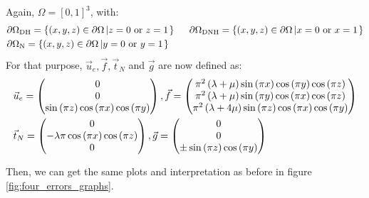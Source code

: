 \documentclass[a4paper,12pt,twoside]{report}
\begin{document}
Again, $\Omega = [0,1]^3$, with: 
\begin{equation*}
	\begin{aligned}
		& \partial \Omega_{\text{DH}} = \left\{  (x,y,z) \in \partial\Omega \left| z = 0 \text{ or } z = 1 \right.  \right\} \hspace{0.5cm} 
		\partial \Omega_{\text{DNH}} = \left\{  (x,y,z) \in \partial\Omega \left| x = 0 \text{ or } x = 1 \right.  \right\} \\
		& \partial \Omega_{\text{N}} = \left\{  (x,y,z) \in \partial\Omega \left| y = 0 \text{ or } y = 1 \right.  \right\}
	\end{aligned}
\end{equation*}
For that purpose, $\vec u_e, \vec f, \vec t_N$ and $\vec g$ are now defined as: 
\begin{equation*}
\begin{aligned}
	& \vec u_e =
	\begin{pmatrix}
		0 \\
		0 \\
		\sin{\left(\pi z \right)} \cos{\left(\pi x \right)} \cos{\left(\pi y \right)}
	\end{pmatrix}, \hfill \vec f =  \begin{pmatrix}
	\pi^{2} \left(\lambda + \mu\right) \sin{\left(\pi x \right)} \cos{\left(\pi y \right)} \cos{\left(\pi z \right)} \\
	\pi^{2} \left(\lambda + \mu\right) \sin{\left(\pi y \right)} \cos{\left(\pi x \right)} \cos{\left(\pi z \right)} \\
	\pi^{2} \left(\lambda + 4 \mu\right) \sin{\left(\pi z \right)} \cos{\left(\pi x \right)} \cos{\left(\pi y \right)}
	\end{pmatrix} \\
	& \vec t_N = \begin{pmatrix}
	0 \\
	- \lambda \pi \cos{\left(\pi x \right)} \cos{\left(\pi z \right)} \\
	0
	\end{pmatrix}, \hfill \vec g = \begin{pmatrix}
	0 \\
	0 \\
	\pm \sin{\left(\pi z \right)} \cos{\left(\pi y \right)}
	\end{pmatrix}
\end{aligned}
\end{equation*} 	

Then, we can get the same plots and interpretation as before in figure \ref{fig:four_errors_graphs}. 
\end{document}

